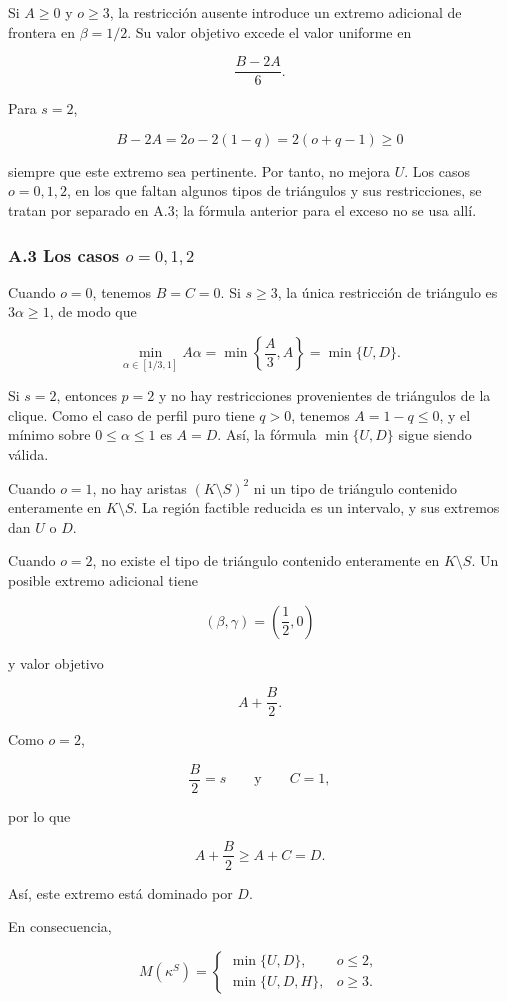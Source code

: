 \documentclass[spanish,11pt,a4paper]{article}
\begin{document}
Si \(A\ge0\) y \(o\ge3\), la restricción ausente introduce un extremo
adicional de frontera en \(\beta=1/2\). Su valor objetivo excede el
valor uniforme en

\[
\frac{B-2A}{6}.
\]

Para \(s=2\),

\[
B-2A
=
2o-2(1-q)
=
2(o+q-1)\ge0
\]

siempre que este extremo sea pertinente. Por tanto, no mejora \(U\). Los
casos \(o=0,1,2\), en los que faltan algunos tipos de triángulos y sus
restricciones, se tratan por separado en A.3; la fórmula anterior para
el exceso no se usa allí.

\subsubsection{\texorpdfstring{A.3 Los casos
\(o=0,1,2\)}{A.3 Los casos o=0,1,2}}\label{a.3-los-casos-o012}

Cuando \(o=0\), tenemos \(B=C=0\). Si \(s\ge3\), la única restricción de
triángulo es \(3\alpha\ge1\), de modo que

\[
\min_{\alpha\in[1/3,1]}A\alpha
=
\min\left\{\frac A3,A\right\}
=
\min\{U,D\}.
\]

Si \(s=2\), entonces \(p=2\) y no hay restricciones provenientes de
triángulos de la clique. Como el caso de perfil puro tiene \(q>0\),
tenemos \(A=1-q\le0\), y el mínimo sobre \(0\le\alpha\le1\) es \(A=D\).
Así, la fórmula \(\min\{U,D\}\) sigue siendo válida.

Cuando \(o=1\), no hay aristas \((K\setminus S)^2\) ni un tipo de
triángulo contenido enteramente en \(K\setminus S\). La región factible
reducida es un intervalo, y sus extremos dan \(U\) o \(D\).

Cuando \(o=2\), no existe el tipo de triángulo contenido enteramente en
\(K\setminus S\). Un posible extremo adicional tiene

\[
(\beta,\gamma)=\left(\frac12,0\right)
\]

y valor objetivo

\[
A+\frac B2.
\]

Como \(o=2\),

\[
\frac B2=s
\qquad\text{y}\qquad
C=1,
\]

por lo que

\[
A+\frac B2\ge A+C=D.
\]

Así, este extremo está dominado por \(D\).

En consecuencia,

\[
M(\kappa^S)
=
\begin{cases}
\min\{U,D\},&o\le2,\\[1mm]
\min\{U,D,H\},&o\ge3.
\end{cases}
\]
\end{document}
